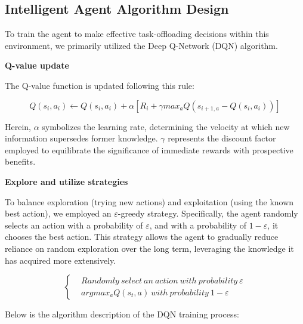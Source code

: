 \documentclass[preprint,12pt,authoryear]{elsarticle}
\begin{document}
\subsection{Intelligent Agent Algorithm Design}
To train the agent to make effective task-offloading decisions within this environment, we primarily utilized the Deep Q-Network (DQN) algorithm.

\textbf{Q-value update}

The Q-value function is updated following this rule:

\begin{equation}
    Q(s_i,a_i)\gets Q(s_i,a_i)+\alpha [R_i+\gamma max_aQ(s_{i+1,a}-Q(s_i,a_i))]
\end{equation}

Herein, \(\alpha\) symbolizes the learning rate, determining the velocity at which new information supersedes former knowledge. \(\gamma\) represents the discount factor employed to equilibrate the significance of immediate rewards with prospective benefits.

\textbf{Explore and utilize strategies}

To balance exploration (trying new actions) and exploitation (using the known best action), we employed an \(\varepsilon\)-greedy strategy. Specifically, the agent randomly selects an action with a probability of \(\varepsilon\), and with a probability of \(1-\varepsilon\), it chooses the best action. This strategy allows the agent to gradually reduce reliance on random exploration over the long term, leveraging the knowledge it has acquired more extensively.

\begin{equation}
    \left\{
        \begin{aligned}
            &Randomly\ select\ an\ action\ with\ probability\ \varepsilon\\
            &argmax_aQ(s_t,a)\ with\  probability\ 1-\varepsilon
        \end{aligned}
    \right.
\end{equation}

Below is the algorithm description of the DQN training process:
\end{document}
